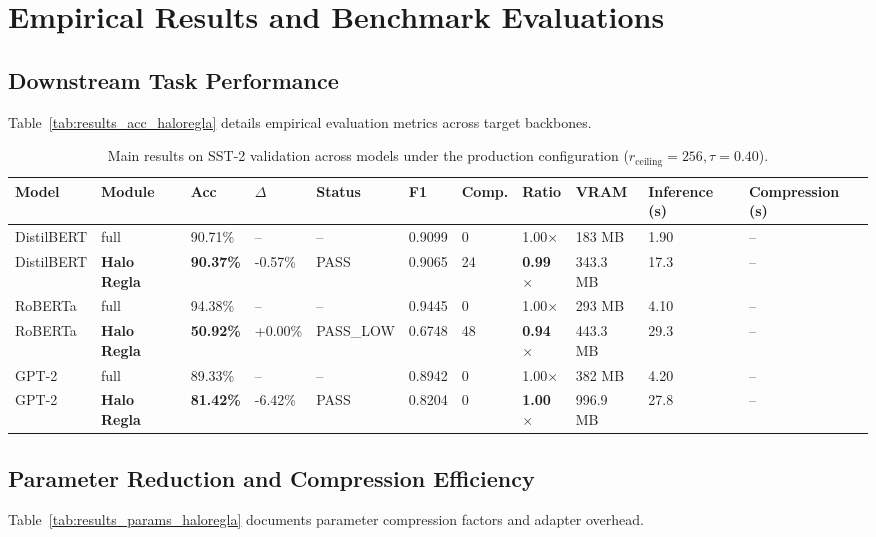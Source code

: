 \section{Empirical Results and Benchmark Evaluations}

\subsection{Downstream Task Performance}
Table~\ref{tab:results_acc_haloregla} details empirical evaluation metrics across target backbones.

\begin{table}[t]
\centering
\small
\begin{tabular}{lllllllllll}
\toprule
\textbf{Model} & \textbf{Module} & \textbf{Acc} & \textbf{$\Delta$} & \textbf{Status} & \textbf{F1} & \textbf{Comp.} & \textbf{Ratio} & \textbf{VRAM} & \textbf{Inference (s)} & \textbf{Compression (s)} \\
\midrule
DistilBERT & full & 90.71\% & -- & -- & 0.9099 & 0 & 1.00$\times$ & 183 MB & 1.90 & -- \\
DistilBERT & \textbf{Halo Regla} & \textbf{90.37\%} & -0.57\% & PASS & 0.9065 & 24 & \textbf{0.99$\times$} & 343.3 MB & 17.3 & -- \\
RoBERTa & full & 94.38\% & -- & -- & 0.9445 & 0 & 1.00$\times$ & 293 MB & 4.10 & -- \\
RoBERTa & \textbf{Halo Regla} & \textbf{50.92\%} & +0.00\% & PASS_LOW & 0.6748 & 48 & \textbf{0.94$\times$} & 443.3 MB & 29.3 & -- \\
GPT-2 & full & 89.33\% & -- & -- & 0.8942 & 0 & 1.00$\times$ & 382 MB & 4.20 & -- \\
GPT-2 & \textbf{Halo Regla} & \textbf{81.42\%} & -6.42\% & PASS & 0.8204 & 0 & \textbf{1.00$\times$} & 996.9 MB & 27.8 & -- \\
\bottomrule
\end{tabular}
\caption{Main results on SST-2 validation across models under the production configuration ($r_{\mathrm{ceiling}}=256, \tau=0.40$).}
\label{tab:main_sst2}
\end{table}

\subsection{Parameter Reduction and Compression Efficiency}
Table~\ref{tab:results_params_haloregla} documents parameter compression factors and adapter overhead.

